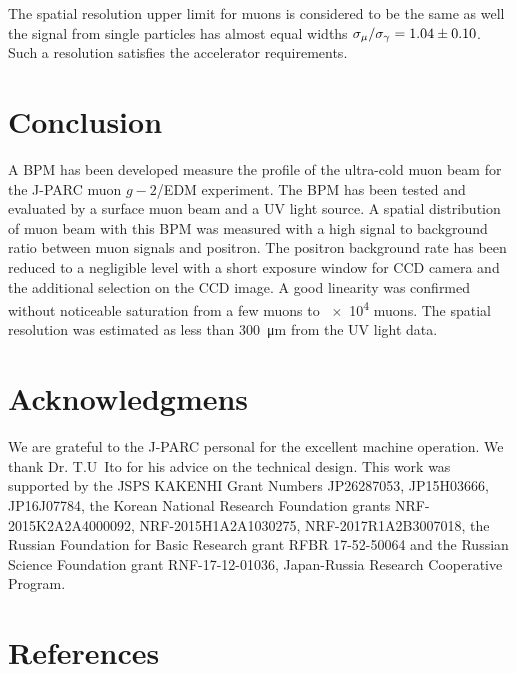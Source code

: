 \documentclass[preprint,3p,twocolumn]{elsarticle}
\begin{document}
The spatial resolution upper limit for muons is considered to be the same as well the signal from single particles has almost equal widths
$\sigma_{\mu} / \sigma_{\gamma} = \num{1.04 \pm 0.10}$.
Such a resolution satisfies the accelerator requirements.


\section{Conclusion}

A BPM has been developed measure the profile of  the ultra-cold muon beam 
for the J-PARC muon $g-2$/EDM experiment. 
The BPM has been tested and evaluated by a surface muon beam and a UV light source.
A spatial distribution of muon beam with this BPM was measured with
a high signal to background ratio between muon signals and positron.
The positron background rate has been reduced to a negligible level with 
a short exposure window for CCD camera and the additional selection on the CCD image.
A good linearity was confirmed without noticeable saturation from a few muons to \num{e4} muons.
The spatial resolution was estimated as less than \SI{300}{\um} from the UV light data.


\section*{Acknowledgmens}

We are grateful to the J-PARC personal for the excellent machine operation.
We thank Dr. T.U~Ito for his advice on the technical design. This work was supported by 
the JSPS KAKENHI Grant Numbers JP26287053, JP15H03666, JP16J07784,
the Korean National Research Foundation grants NRF-2015K2A2A4000092, NRF-2015H1A2A1030275, NRF-2017R1A2B3007018,
the Russian Foundation for Basic Research grant RFBR 17-52-50064 and
the Russian Science Foundation grant RNF-17-12-01036,
Japan-Russia Research Cooperative Program.

\section*{References}


\end{document}
